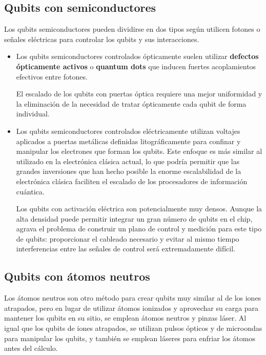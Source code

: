 	\subsection{Qubits con semiconductores}
	
Los qubits semiconductores pueden dividirse en dos tipos según utilicen fotones o señales eléctricas para controlar los qubits y sus interacciones. 
\begin{itemize}
\item Los qubits semiconductores controlados ópticamente suelen utilizar \textbf{defectos ópticamente activos} o \textbf{quantum dots} que inducen fuertes acoplamientos efectivos entre fotones.

El escalado de los qubits con puertas óptica requiere una mejor uniformidad y la eliminación de la necesidad de tratar ópticamente cada qubit de forma individual.

\item Los qubits semiconductores controlados eléctricamente utilizan voltajes aplicados a puertas metálicas definidas litográficamente para confinar y manipular los electrones que forman los qubits. Este enfoque es más similar al utilizado en la electrónica clásica actual, lo que podría permitir que las grandes inversiones que han hecho posible la enorme escalabilidad de la electrónica clásica faciliten el escalado de los procesadores de información cuántica. 

Los qubits con activación eléctrica son potencialmente muy densos. Aunque la alta densidad puede permitir integrar un gran número de qubits en el chip, agrava el problema de construir un plano de control y medición para este tipo de qubits: proporcionar el cableado necesario y evitar al mismo tiempo interferencias entre las señales de control será extremadamente difícil.
\end{itemize} 



  
  


	\subsection{Qubits con átomos neutros}
	
Los átomos neutros son otro método para crear qubits muy similar al de los iones atrapados, pero en lugar de utilizar átomos ionizados y aprovechar su carga para mantener los qubits en su sitio, se emplean átomos neutros y pinzas láser. Al igual que los qubits de iones atrapados, se utilizan pulsos ópticos y de microondas para manipular los qubits, y también se emplean láseres para enfriar los átomos antes del cálculo.

